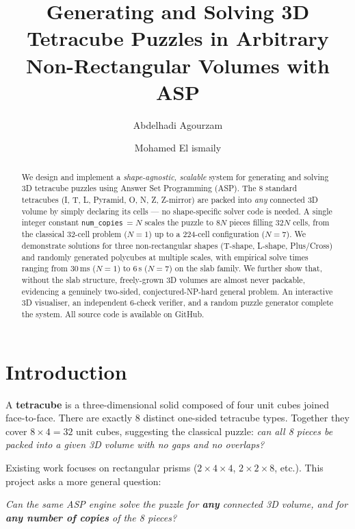 \documentclass[a4paper,UKenglish,cleveref,autoref]{lipics-v2021}
\title{Generating and Solving 3D Tetracube Puzzles in Arbitrary
       Non-Rectangular Volumes with ASP}
\author{Abdelhadi Agourzam}{Universit\'e de Mons (UMONS), Facult\'e des
  Sciences, Belgium}{abdelhadiagourzam@gmail.com}{}{}
\author{Mohamed El ismaily}{Universit\'e de Mons (UMONS), Facult\'e des
  Sciences, Belgium}{}{}{}
\begin{document}
\maketitle

\begin{abstract}
We design and implement a \emph{shape-agnostic, scalable} system for generating
and solving 3D tetracube puzzles using Answer Set Programming (ASP).  The 8
standard tetracubes (I, T, L, Pyramid, O, N, Z, Z-mirror) are packed into
\emph{any} connected 3D volume by simply declaring its cells --- no
shape-specific solver code is needed.  A single integer constant
\texttt{num\_copies}\,$=N$ scales the puzzle to $8N$ pieces filling $32N$ cells,
from the classical 32-cell problem ($N=1$) up to a 224-cell configuration
($N=7$).  We demonstrate solutions for three non-rectangular shapes (T-shape,
L-shape, Plus/Cross) and randomly generated polycubes at multiple scales, with
empirical solve times ranging from 30\,ms ($N=1$) to 6\,s ($N=7$) on the
slab family.  We further show that, without the slab structure, freely-grown 3D
volumes are almost never packable, evidencing a genuinely two-sided,
conjectured-NP-hard general problem.  An interactive 3D visualiser, an
independent 6-check verifier, and a random puzzle generator complete the system.
All source code is available on GitHub.
\end{abstract}

\section{Introduction}

A \textbf{tetracube} is a three-dimensional solid composed of four unit cubes
joined face-to-face.  There are exactly 8 distinct one-sided tetracube types.
Together they cover $8 \times 4 = 32$ unit cubes, suggesting the classical
puzzle: \emph{can all 8 pieces be packed into a given 3D volume with no gaps
and no overlaps?}

Existing work focuses on rectangular prisms ($2\times4\times4$,
$2\times2\times8$, etc.).  This project asks a more general question:

\begin{center}
\emph{Can the same ASP engine solve the puzzle for \textbf{any} connected
3D volume, and for \textbf{any number of copies} of the 8 pieces?}
\end{center}
\end{document}
